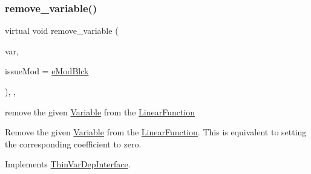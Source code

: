\subsubsection{\texorpdfstring{remove\+\_\+variable()}{remove\_variable()}\hspace{0.1cm}{\footnotesize\ttfamily [1/2]}}
{\footnotesize\ttfamily virtual void remove\+\_\+variable (\begin{DoxyParamCaption}\item[{\mbox{\hyperlink{class_s_m_spp__di__unipi__it_1_1_variable}{Variable}} $\ast$}]{var,  }\item[{\mbox{\hyperlink{group___modification___t_y_p_e_s_ga544246d8c462e9a2d817c2c30797968f}{c\+\_\+\+Mod\+Param}}}]{issue\+Mod = {\ttfamily \mbox{\hyperlink{group___modification___t_y_p_e_s_gga48fddcdd03a03f49b7e389ca1ed938d4a21b14b26b1c0093a0905f6fc010bad29}{e\+Mod\+Blck}}} }\end{DoxyParamCaption})\hspace{0.3cm}{\ttfamily [final]}, {\ttfamily [override]}, {\ttfamily [virtual]}}



remove the given \mbox{\hyperlink{class_s_m_spp__di__unipi__it_1_1_variable}{Variable}} from the \mbox{\hyperlink{class_s_m_spp__di__unipi__it_1_1_linear_function}{Linear\+Function}} 

Remove the given \mbox{\hyperlink{class_s_m_spp__di__unipi__it_1_1_variable}{Variable}} from the \mbox{\hyperlink{class_s_m_spp__di__unipi__it_1_1_linear_function}{Linear\+Function}}. This is equivalent to setting the corresponding coefficient to zero. 

Implements \mbox{\hyperlink{group___thin_var_dep_interface___c_l_a_s_s_e_s_gad6726141a0cbe6a0410a2b396809dade}{Thin\+Var\+Dep\+Interface}}.

\mbox{\label{class_s_m_spp__di__unipi__it_1_1_linear_function_aad852e9ce977216d4ed5dc7a4216845d}} 
